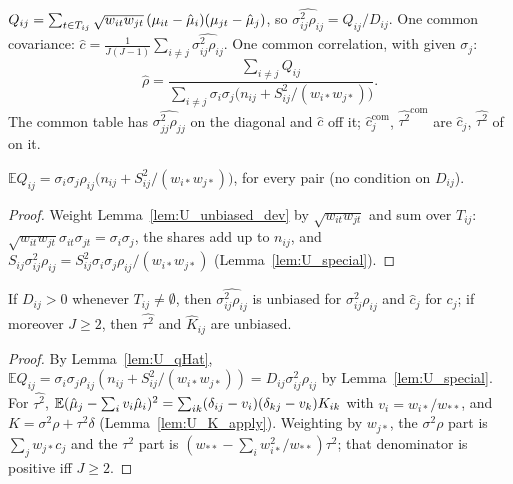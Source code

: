 \begin{definition}\label{def:U_pooled}
  \leanok
  $Q_{ij} = \sum_{t \in T_{ij}} \sqrt{w_{it}w_{jt}}\,(\mu_{it}-\hat\mu_i)(\mu_{jt}-\hat\mu_j)$, so
  $\widehat{\sigma^2_{ij}\rho_{ij}} = Q_{ij}/D_{ij}$. One common covariance:
  $\hat c = \frac{1}{J(J-1)}\sum_{i \ne j}\widehat{\sigma^2_{ij}\rho_{ij}}$. One common
  correlation, with given $\sigma_j$:
  \[
    \hat\rho = \frac{\sum_{i \ne j} Q_{ij}}
      {\sum_{i \ne j}\sigma_i\sigma_j\bigl(n_{ij} + S_{ij}^2/(w_{i*}w_{j*})\bigr)}.
  \]
  The common table has $\widehat{\sigma^2_{jj}\rho_{jj}}$ on the diagonal and $\hat c$ off it;
  $\hat c_j^{\mathrm{com}}$, $\widehat{\tau^2}^{\mathrm{com}}$ are $\hat c_j$, $\widehat{\tau^2}$
  of  on it.
\end{definition}

\begin{lemma}\label{lem:U_qHat}
  \leanok
  $\mathbb{E}Q_{ij} = \sigma_i\sigma_j\rho_{ij}\bigl(n_{ij} + S_{ij}^2/(w_{i*}w_{j*})\bigr)$,
  for every pair (no condition on $D_{ij}$).
\end{lemma}
\begin{proof}
  \leanok
  Weight Lemma~\ref{lem:U_unbiased_dev} by $\sqrt{w_{it}w_{jt}}$ and sum over $T_{ij}$:
  $\sqrt{w_{it}w_{jt}}\sigma_{it}\sigma_{jt} = \sigma_i\sigma_j$, the shares add up to
  $n_{ij}$, and $S_{ij}\sigma^2_{ij}\rho_{ij} = S_{ij}^2\sigma_i\sigma_j\rho_{ij}/(w_{i*}w_{j*})$
  (Lemma~\ref{lem:U_special}).
\end{proof}

\begin{theorem}\label{thm:U_unbiased}
  \leanok
  If $D_{ij} > 0$ whenever $T_{ij} \ne \emptyset$, then
  $\widehat{\sigma^2_{ij}\rho_{ij}}$ is unbiased for $\sigma^2_{ij}\rho_{ij}$ and
  $\hat c_j$ for $c_j$; if moreover $J \ge 2$, then $\widehat{\tau^2}$ and $\hat K_{ij}$ are unbiased.
\end{theorem}
\begin{proof}
  \leanok
  By Lemma~\ref{lem:U_qHat}, $\mathbb{E}Q_{ij} = \sigma_i\sigma_j\rho_{ij}(n_{ij} + S_{ij}^2/(w_{i*}w_{j*}))
  = D_{ij}\sigma^2_{ij}\rho_{ij}$ by Lemma~\ref{lem:U_special}. For
  $\widehat{\tau^2}$, $\mathbb{E}(\hat\mu_j - \sum_i v_i\hat\mu_i)^2
  = \sum_{ik}(\delta_{ij}-v_i)(\delta_{kj}-v_k)K_{ik}$ with $v_i = w_{i*}/w_{**}$,
  and $K = \sigma^2\rho + \tau^2\delta$ (Lemma~\ref{lem:U_K_apply}). Weighting by
  $w_{j*}$, the $\sigma^2\rho$ part is $\sum_j w_{j*}c_j$ and the $\tau^2$ part is
  $(w_{**} - \sum_i w_{i*}^2/w_{**})\tau^2$; that denominator is positive iff $J \ge 2$.
\end{proof}

